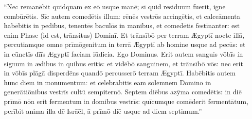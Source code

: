 ``Nec remanēbit quidquam ex eō usque manē; sī quid
residuum fuerit, igne
combūrētis. Sīc autem comedētis illum:
rēnēs vestrōs accingētis, et
calceāmenta habēbitis in pedibus,
tenentēs baculōs in manibus, et comedētis festīnanter: est
enim Phase (id est, trānsitus) Dominī. Et trānsībō per
terram Ægyptī nocte illā, percutiamque omne prīmōgenitum in
terrā Ægyptī ab homine usque ad pecūs: et in cūnctīs dīīs Ægyptī faciam
iūdicia. Ego Dominus. Erit autem sanguis vōbīs in signum
in ædibus in quibus eritis: et vidēbō sanguinem, et
trānsībō vōs: nec erit in vōbīs plāgā
disperdēns quandō percusserō terram Ægyptī. Habēbitis
autem hunc diem in monumentum: et
celebrābitis eam sōlemnem Dominō in
generātiōnibus vestrīs cultū sempiternō.
Septem diēbus azȳma comedētis: in diē prīmō nōn erit
fermentum in domibus vestrīs: quīcumque comēderit
fermentātum, perībit anima illa dē Isrāēl, ā prīmō diē
usque ad diem septimum.''


